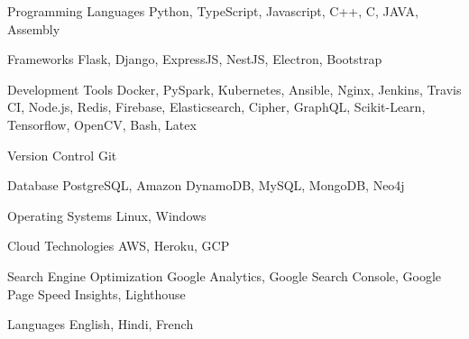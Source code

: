 

\begin{cvskills}

  \cvskill
    {Programming Languages} %
    {Python, TypeScript, Javascript, C++, C, JAVA, Assembly} %
    
  \cvskill
    {Frameworks} %
    {Flask, Django, ExpressJS, NestJS, Electron, Bootstrap} %

  \cvskill
    {Development Tools} %
    {Docker, PySpark, Kubernetes, Ansible, Nginx, Jenkins, Travis CI, Node.js, Redis, Firebase, Elasticsearch, Cipher, GraphQL, Scikit-Learn, Tensorflow, OpenCV, Bash, Latex} %
    
  \cvskill
    {Version Control} %
    {Git} %
    
  \cvskill
    {Database} %
    {PostgreSQL, Amazon DynamoDB, MySQL, MongoDB, Neo4j} %

  \cvskill
    {Operating Systems} %
    {Linux, Windows} %

  \cvskill
    {Cloud Technologies} %
    {AWS, Heroku, GCP} %

  \cvskill
    {Search Engine Optimization} %
    {Google Analytics, Google Search Console, Google Page Speed Insights, Lighthouse} %
    
  \cvskill
    {Languages} %
    {English, Hindi, French} %

\end{cvskills}
